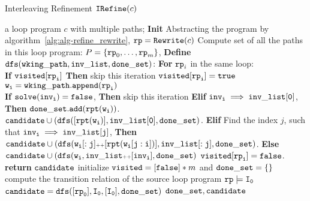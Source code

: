 

  \begin{algorithm}
    \caption{
    {Interleaving Refinement $\mathtt{IRefine}(c)$}
    }
    \label{alg:prog-refine}
    \begin{algorithmic}[1]
    \REQUIRE a loop program $c$ with multiple paths;
    \STATE  \textbf{Init} 
    \STATE Abstracting the program by algorithm~\ref{alg:alg-refine_rewrite},  $\mathtt{rp} = \mathtt{Rewrite}(c)$
    \STATE  Compute set of all the paths in this loop program:
    $P = \{\mathtt{rp}_0, \ldots, \mathtt{rp}_m\}$,
    \STATE \textbf{Define} {$\mathtt{dfs(wking\_path, inv\_list, done\_set)}$:}
    \STATE {}
    \STATE {}
    \STATE \quad \textbf{For} $\mathtt{rp}_i$ in the same loop:
    \\
    \STATE \quad \quad \textbf{If} {$\mathtt{visited[\mathtt{rp}_i]}$} \textbf{Then} skip this iteration
    \STATE \quad \quad $\mathtt{visited[\mathtt{rp}_i]} = \mathtt{true}$
    \STATE \quad \quad $\mathtt{w_i = wking\_path.append(\mathtt{rp}_i)}$
    \\
    \quad {}
    \STATE \quad \quad \textbf{If} {$\mathtt{solve(inv_i) = \mathtt{false}}$}, \textbf{Then} skip this iteration
    \STATE \quad \quad \textbf{Elif} {$\mathtt{inv_i \implies inv\_list[0]}$}, \textbf{Then}  $\mathtt{done\_set.add(\mathtt{rpt}(w_i))}$.
    \STATE \quad \quad \quad
    $\mathtt{candidate \cup (dfs([\mathtt{rpt}(w_i)], inv\_list[0], done\_set)}$.
    \STATE \quad \quad \textbf{Elif} 
    Find the index $j$, such that $\mathtt{inv_i \implies inv\_list[j] }$, \textbf{Then}
    \STATE \quad \quad \quad
    $\mathtt{candidate \cup (dfs(w_i[:j] {\scriptscriptstyle ++} [\mathtt{rpt}(w_i[j:i])], inv\_list[:j], done\_set)}$.
    \STATE \quad \quad \textbf{Else}  
    $\mathtt{candidate \cup (dfs(w_i, inv\_list{\scriptscriptstyle ++}[inv_i], done\_set)}$
    \STATE \quad \quad $\mathtt{visited[\mathtt{rp}_i]} = \mathtt{false}$.
    \STATE \quad \textbf{return} $\mathtt{candidate}$
    \STATE initialize $\mathtt{visited} = [\mathtt{false}]*m$ and $\mathtt{done\_set = \{\}}$
    \STATE compute the transition relation of the source loop program $\mathtt{rp} \models \mathtt{I_0}$
    \STATE $\mathtt{candidate = dfs([\mathtt{rp}_0], I_0, [I_0], done\_set )}$
    \RETURN $\mathtt{done\_set, candidate}$
    \end{algorithmic}
    \end{algorithm}


